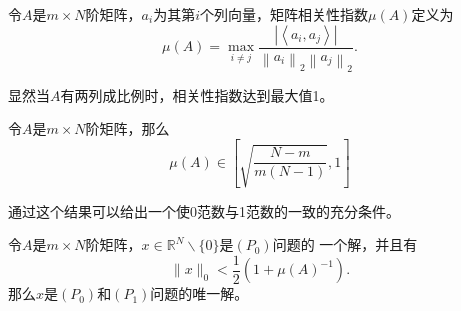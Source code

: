 \begin{definition}
    令$A$是$m\times N$阶矩阵，$a_i$为其第$i$个列向量，矩阵相关性指数$\mu (A)$定义为
    \begin{equation}
        \mu(A)=\max _{i \neq j} \frac{\left|\left\langle a_i,a_j\right\rangle\right|}{\left\|a_i\right\|_2\left\|a_j\right\|_2} .
    \end{equation}
\end{definition}
显然当$A$有两列成比例时，相关性指数达到最大值1。
\begin{lemma}
    令$A$是$m\times N$阶矩阵，那么
    \begin{equation}
        \mu(A) \in\left[\sqrt{\frac{N-m}{m(N-1)}},1\right]
    \end{equation}
\end{lemma}
通过这个结果可以给出一个使0范数与1范数的一致的充分条件。
\begin{theorem}
    令$A$是$m\times N$阶矩阵，$x \in \mathbb{R}^N \backslash\{0\}$是$(P_0)$问题的
    一个解，并且有
    \begin{equation}
        \|x\|_0<\frac{1}{2}\left(1+\mu(A)^{-1}\right) .
    \end{equation}
    那么$x$是$(P_0)$和$(P_1)$问题的唯一解。
\end{theorem}

